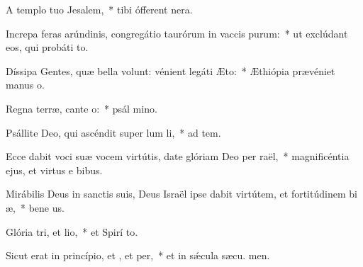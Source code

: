 \item A templo tuo  Jesalem,~* tibi ófferent  nera.
\item Increpa feras arúndinis, congregátio taurórum in vaccis purum:~* ut exclúdant eos, qui probáti  to.
\item Díssipa Gentes, quæ bella volunt: vénient legáti  Æto:~* Æthiópia prævéniet manus  o.
\item Regna terræ, cante o:~* psál mino.
\item Psállite Deo, qui ascéndit super lum li,~* ad tem.
\item Ecce dabit voci suæ vocem virtútis, date glóriam Deo per raël,~* magnificéntia ejus, et virtus e  bibus.
\item Mirábilis Deus in sanctis suis, Deus Israël ipse dabit virtútem, et fortitúdinem bi æ,~* bene us.
\item Glória tri, et lio,~* et Spirí to.
\item Sicut erat in princípio, et , et per,~* et in sǽcula sæcu. men.
